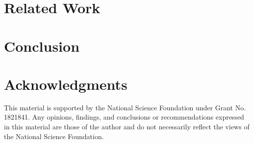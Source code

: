 \documentclass[a4paper,twoside]{article}
\begin{document}
\section{Related Work}
\label{sec:related}


\section{Conclusion}
\label{sec:concl}


\section{Acknowledgments}
This material is supported by the National Science Foundation under Grant No. 1821841. Any
opinions, findings, and conclusions or recommendations expressed in this material are those of the author and do not necessarily reflect the views of the National Science Foundation.


{\small
}
\end{document}
